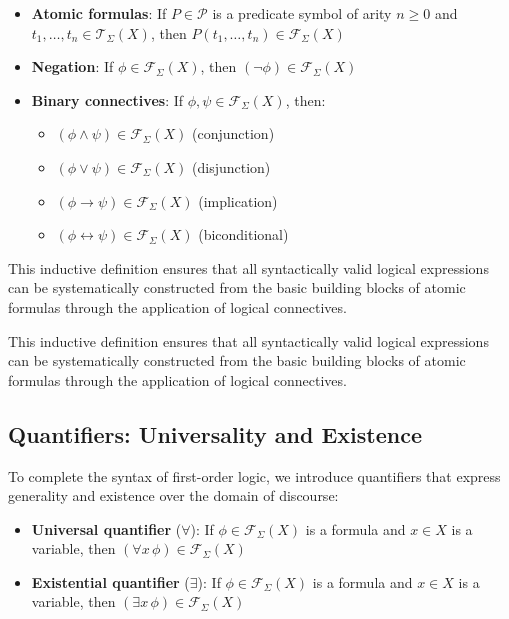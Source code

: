 \documentclass[11pt,a4paper]{article}
\theoremstyle{definition}
\theoremstyle{plain}
\theoremstyle{remark}
\begin{document}
\begin{itemize}
    \item \textbf{Atomic formulas}: If $P \in \mathcal{P}$ is a predicate symbol of arity $n \geq 0$ and $t_1, \dots, t_n \in \mathcal{T}_\Sigma(X)$, then $P(t_1, \dots, t_n) \in \mathcal{F}_\Sigma(X)$

    \item \textbf{Negation}: If $\phi \in \mathcal{F}_\Sigma(X)$, then $(\neg \phi) \in \mathcal{F}_\Sigma(X)$

    \item \textbf{Binary connectives}: If $\phi, \psi \in \mathcal{F}_\Sigma(X)$, then:
        \begin{itemize}
            \item $(\phi \wedge \psi) \in \mathcal{F}_\Sigma(X)$ (conjunction)
            \item $(\phi \vee \psi) \in \mathcal{F}_\Sigma(X)$ (disjunction)
            \item $(\phi \rightarrow \psi) \in \mathcal{F}_\Sigma(X)$ (implication)
            \item $(\phi \leftrightarrow \psi) \in \mathcal{F}_\Sigma(X)$ (biconditional)
        \end{itemize}
\end{itemize}

This inductive definition ensures that all syntactically valid logical expressions can be systematically constructed from the basic building blocks of atomic formulas through the application of logical connectives. 

This inductive definition ensures that all syntactically valid logical expressions can be systematically constructed from the basic building blocks of atomic formulas through the application of logical connectives.

\subsection{Quantifiers: Universality and Existence}

To complete the syntax of first-order logic, we introduce quantifiers that express generality and existence over the domain of discourse:

\begin{itemize}
    \item \textbf{Universal quantifier} ($\forall$): If $\phi \in \mathcal{F}_\Sigma(X)$ is a formula and $x \in X$ is a variable, then $(\forall x \, \phi) \in \mathcal{F}_\Sigma(X)$
    \item \textbf{Existential quantifier} ($\exists$): If $\phi \in \mathcal{F}_\Sigma(X)$ is a formula and $x \in X$ is a variable, then $(\exists x \, \phi) \in \mathcal{F}_\Sigma(X)$
\end{itemize}
\end{document}
